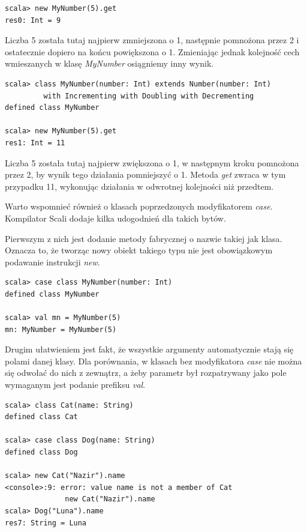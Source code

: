 \documentclass[brudnopis]{xmgr}
\begin{document}
\begin{verbatim}
scala> new MyNumber(5).get
res0: Int = 9
\end{verbatim}

Liczba 5 została tutaj najpierw zmniejszona o 1, następnie pomnożona przez 2 i ostatecznie dopiero na końcu powiększona o 1. Zmieniając jednak kolejność cech wmieszanych w klasę \emph{MyNumber} osiągniemy inny wynik.

\begin{verbatim}
scala> class MyNumber(number: Int) extends Number(number: Int) 
         with Incrementing with Doubling with Decrementing
defined class MyNumber

scala> new MyNumber(5).get
res1: Int = 11
\end{verbatim}

Liczba 5 została tutaj najpierw zwiększona o 1, w następnym kroku pomnożona przez 2, by wynik tego działania pomniejszyć o 1. Metoda \emph{get} zwraca w tym przypadku 11, wykonując działania w odwrotnej kolejności niż przedtem.

Warto wspomnieć również o klasach poprzedzonych modyfikatorem \emph{case}. Kompilator Scali dodaje kilka udogodnień dla takich bytów. 

Pierwszym z nich jest dodanie metody fabrycznej o nazwie takiej jak klasa. Oznacza to, że tworząc nowy obiekt takiego typu nie jest obowiązkowym podawanie instrukcji \emph{new}. 

\begin{verbatim}
scala> case class MyNumber(number: Int)
defined class MyNumber

scala> val mn = MyNumber(5)
mn: MyNumber = MyNumber(5)
\end{verbatim}

Drugim ułatwieniem jest fakt, że wszystkie argumenty automatycznie stają się polami danej klasy. Dla porównania, w klasach bez modyfikatora \emph{case} nie można się odwołać do nich z zewnątrz, a żeby parametr był rozpatrywany jako pole wymaganym jest podanie prefiksu \emph{val}.

\begin{verbatim}
scala> class Cat(name: String)
defined class Cat

scala> case class Dog(name: String)
defined class Dog

scala> new Cat("Nazir").name
<console>:9: error: value name is not a member of Cat
              new Cat("Nazir").name
scala> Dog("Luna").name
res7: String = Luna           
\end{verbatim}
\end{document}
